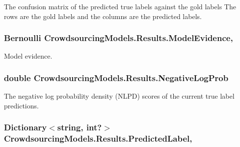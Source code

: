 The confusion matrix of the predicted true labels against the gold labels The rows are the gold labels and the columns are the predicted labels. 

\hypertarget{class_crowdsourcing_models_1_1_results_ad7d3df074d2f06c1d4c979a03b371e98}{}
\subsubsection[{Model\+Evidence}]{\setlength{\rightskip}{0pt plus 5cm}Bernoulli Crowdsourcing\+Models.\+Results.\+Model\+Evidence\hspace{0.3cm}{\ttfamily [get]}, {}}\label{class_crowdsourcing_models_1_1_results_ad7d3df074d2f06c1d4c979a03b371e98}


Model evidence. 

\hypertarget{class_crowdsourcing_models_1_1_results_a61808b2f35c5c4f739ed37eef609bfef}{}
\subsubsection[{Negative\+Log\+Prob}]{\setlength{\rightskip}{0pt plus 5cm}double Crowdsourcing\+Models.\+Results.\+Negative\+Log\+Prob\hspace{0.3cm}{\ttfamily [get]}}\label{class_crowdsourcing_models_1_1_results_a61808b2f35c5c4f739ed37eef609bfef}


The negative log probability density (N\+L\+P\+D) scores of the current true label predictions. 

\hypertarget{class_crowdsourcing_models_1_1_results_ae5a5447d6999e2afe99d68dfa839daa5}{}
\subsubsection[{Predicted\+Label}]{\setlength{\rightskip}{0pt plus 5cm}Dictionary$<$string, int?$>$ Crowdsourcing\+Models.\+Results.\+Predicted\+Label\hspace{0.3cm}{\ttfamily [get]}, {}}\label{class_crowdsourcing_models_1_1_results_ae5a5447d6999e2afe99d68dfa839daa5}


